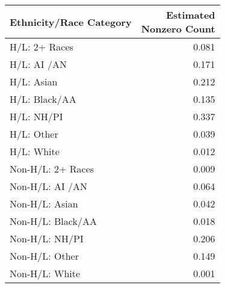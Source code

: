 \begin{table}[ht]
\centering
\begin{tabular}{lr}
 Ethnicity/Race Category & \thead{Estimated \\ Nonzero Count} \\ 
  \hline
H/L: 2+ Races & 0.081 \\ 
H/L: AI /AN & 0.171 \\ 
  H/L: Asian & 0.212 \\ 
  H/L: Black/AA & 0.135 \\ 
  H/L: NH/PI & 0.337 \\ 
  H/L: Other & 0.039 \\ 
  H/L: White & 0.012 \\ 
   \hline
Non-H/L: 2+ Races & 0.009 \\ 
  Non-H/L: AI /AN & 0.064 \\ 
  Non-H/L: Asian & 0.042 \\ 
  Non-H/L: Black/AA & 0.018 \\ 
  Non-H/L: NH/PI & 0.206 \\ 
  Non-H/L: Other & 0.149 \\ 
  Non-H/L: White & 0.001 \\ 
  \end{tabular}
\end{table}
